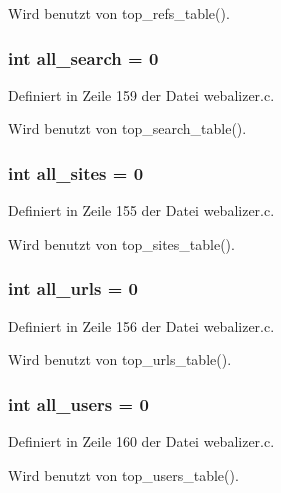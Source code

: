 Wird benutzt von top\_\-refs\_\-table().
\subsubsection{\setlength{\rightskip}{0pt plus 5cm}int {\bf all\_\-search} = 0}\label{webalizer_8c_f51b93932a98e306bd47239ec9c99f23}




Definiert in Zeile 159 der Datei webalizer.c.

Wird benutzt von top\_\-search\_\-table().
\subsubsection{\setlength{\rightskip}{0pt plus 5cm}int {\bf all\_\-sites} = 0}\label{webalizer_8c_e80c0d7d06836110749922f34dd902c2}




Definiert in Zeile 155 der Datei webalizer.c.

Wird benutzt von top\_\-sites\_\-table().
\subsubsection{\setlength{\rightskip}{0pt plus 5cm}int {\bf all\_\-urls} = 0}\label{webalizer_8c_633444563a9587349d9a5f158062b662}




Definiert in Zeile 156 der Datei webalizer.c.

Wird benutzt von top\_\-urls\_\-table().
\subsubsection{\setlength{\rightskip}{0pt plus 5cm}int {\bf all\_\-users} = 0}\label{webalizer_8c_395ccae1fd2f2450f623db87fbd9f9e1}




Definiert in Zeile 160 der Datei webalizer.c.

Wird benutzt von top\_\-users\_\-table().
